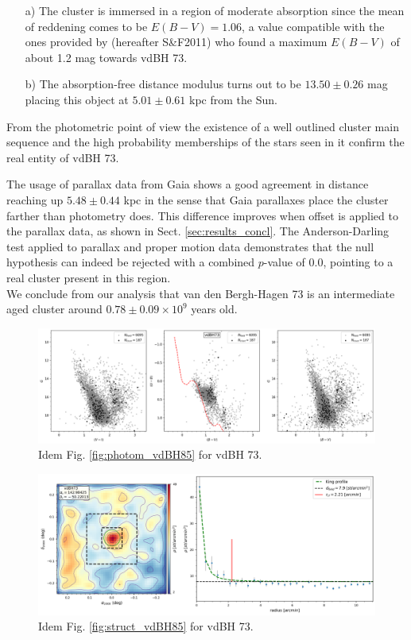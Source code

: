 \documentclass[draft]{aa}
\begin{document}
\begin{itemize}
\item [a)] The cluster is immersed in a region of moderate absorption
since the mean of reddening comes to be $E(B-V)=1.06$, a value compatible
with the ones provided by \cite{Schlafly_2011} (hereafter S\&F2011) who
found a maximum $E(B-V)$ of about 1.2 mag towards vdBH 73.
\item [b)] The absorption-free distance modulus turns out to be
$13.50\pm0.26$ mag placing this object at $5.01\pm0.61$ kpc from the Sun.
\end{itemize}

From the photometric point of view the existence of a well outlined cluster main
sequence and the high probability memberships of the stars seen in it confirm
the real entity of vdBH 73.

The usage of parallax data from Gaia shows a good agreement in distance
reaching up $5.48\pm0.44$ kpc in the sense that Gaia parallaxes place the
cluster farther than photometry does. This difference improves when offset is
applied to the parallax data, as shown in Sect. \ref{sec:results_concl}.
The Anderson-Darling test applied to parallax and proper motion data
demonstrates that the null hypothesis can indeed be rejected with a
combined $p$-value of 0.0, pointing to a real cluster present in this
region.\\

We conclude from our analysis that van den Bergh-Hagen 73 is an intermediate
aged cluster around $0.78\pm0.09\times10^9$ years old.


\begin{figure}[ht]
    \centering
    \includegraphics[width=\hsize]{../figs/obs_vdBH73.png}
\caption{Idem Fig. \ref{fig:photom_vdBH85} for vdBH 73.}
    \label{fig:photom_vdBH73}
\end{figure}

\begin{figure}[ht]
    \centering
    \includegraphics[width=\hsize]{../figs/dmap_vdbh73.png}
\caption{Idem Fig. \ref{fig:struct_vdBH85} for vdBH 73.}
    \label{fig:struct_vdBH73}
\end{figure}
\end{document}
